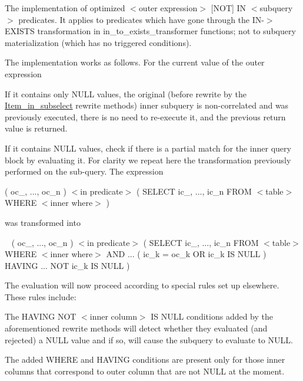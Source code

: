The implementation of optimized $<$outer expression$>$ \mbox{[}N\+OT\mbox{]} IN $<$subquery$>$ predicates. It applies to predicates which have gone through the IN-\/$>$E\+X\+I\+S\+TS transformation in in\+\_\+to\+\_\+exists\+\_\+transformer functions; not to subquery materialization (which has no triggered conditions).

The implementation works as follows. For the current value of the outer expression


\begin{DoxyItemize}
\item If it contains only N\+U\+LL values, the original (before rewrite by the \mbox{\hyperlink{classItem__in__subselect}{Item\+\_\+in\+\_\+subselect}} rewrite methods) inner subquery is non-\/correlated and was previously executed, there is no need to re-\/execute it, and the previous return value is returned.
\item If it contains N\+U\+LL values, check if there is a partial match for the inner query block by evaluating it. For clarity we repeat here the transformation previously performed on the sub-\/query. The expression

{\ttfamily  ( oc\+\_, ..., oc\+\_\+n ) $<$in predicate$>$ ( S\+E\+L\+E\+CT ic\+\_, ..., ic\+\_\+n F\+R\+OM $<$table$>$ W\+H\+E\+RE $<$inner where$>$ ) }

was transformed into
\end{DoxyItemize}

~\newline
 {\ttfamily  ( oc\+\_, ..., oc\+\_\+n ) $<$in predicate$>$ ( S\+E\+L\+E\+CT ic\+\_, ..., ic\+\_\+n F\+R\+OM $<$table$>$ W\+H\+E\+RE $<$inner where$>$ A\+ND ... ( ic\+\_\+k = oc\+\_\+k OR ic\+\_\+k IS N\+U\+LL ) H\+A\+V\+I\+NG ... N\+OT ic\+\_\+k IS N\+U\+LL ) }

The evaluation will now proceed according to special rules set up elsewhere. These rules include\+:


\begin{DoxyItemize}
\item The H\+A\+V\+I\+NG N\+OT $<$inner column$>$ IS N\+U\+LL conditions added by the aforementioned rewrite methods will detect whether they evaluated (and rejected) a N\+U\+LL value and if so, will cause the subquery to evaluate to N\+U\+LL.
\item The added W\+H\+E\+RE and H\+A\+V\+I\+NG conditions are present only for those inner columns that correspond to outer column that are not N\+U\+LL at the moment.
\end{DoxyItemize}

